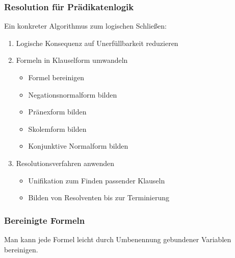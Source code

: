 \documentclass[aspectratio=1610,onlymath]{beamer}
\begin{document}
\maketitle

\begin{frame}\frametitle{Resolution für Prädikatenlogik}

Ein konkreter Algorithmus zum logischen Schließen:
\begin{enumerate}[(1)]
\item \alert{Logische Konsequenz auf Unerfüllbarkeit reduzieren}
\item \alert{Formeln in Klauselform umwandeln}
	\begin{itemize}
	\item Formel bereinigen
	\item Negationsnormalform bilden
	\item \textcolor{devilscss}{Pränexform bilden}
	\item \textcolor{devilscss}{Skolemform bilden}
	\item \textcolor{devilscss}{Konjunktive Normalform bilden}
	\end{itemize}
\item \alert{Resolutionsverfahren anwenden}
	\begin{itemize}
	\item \textcolor{devilscss}{Unifikation zum Finden passender Klauseln}
	\item \textcolor{devilscss}{Bilden von Resolventen bis zur Terminierung}
	\end{itemize}
\end{enumerate}

\end{frame}


\begin{frame}\frametitle{Bereinigte Formeln}


Man kann jede Formel leicht durch Umbenennung gebundener Variablen
bereinigen.


\end{frame}
\end{document}
